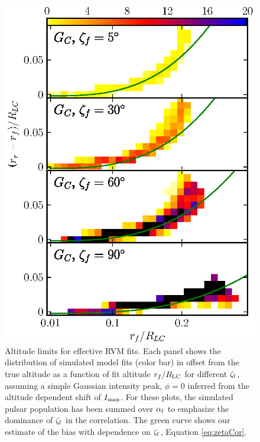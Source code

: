 \begin{figure}[htbp]
\begin{center}
\includegraphics[width=.9\textwidth]{chapters/BCWlimitations/figures/zetaResmagMin.eps}
\caption[Altitude limits for effective RVM fits]{
Altitude limits for effective RVM fits.  Each panel shows the distribution
of simulated model fits (color bar) in offset from the true altitude as a function
of fit altitude $r_f/R_{\rm{LC}}$ for different $\zeta_{\rm{f}}$, assuming a simple Gaussian intensity peak, 
$\phi=0$ inferred from the altitude dependent shift of $I_{\rm{max}}$.
For these plots, the simulated pulsar population has been 
summed over $\alpha_{\rm{f}}$ to emphasize the dominance of $\zeta_{\rm{f}}$ in the correlation.
The green curve shows our estimate of the bias with dependence on 
$\zeta_{\rm{f}}$, Equation \ref{eq:zetaCor}.
}
\label{fig:zetaResmagMin}
\end{center}
\end{figure}

